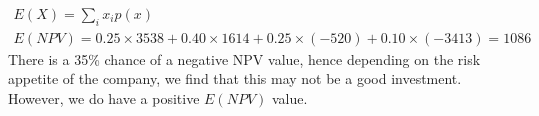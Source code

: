 \begin{gather}
    E\left(X\right) = \sum_i x_i p\left(x\right)\\
    E\left(NPV\right) = 0.25 \times 3538 + 0.40 \times 1614 + 0.25\times (-520) + 0.10 \times (-3413) = 1086
\end{gather}
There is a 35\% chance of a negative NPV value, hence depending on the risk appetite of the company, we find that this may not be a good investment. However, we do have a positive $E\left(NPV\right)$ value.